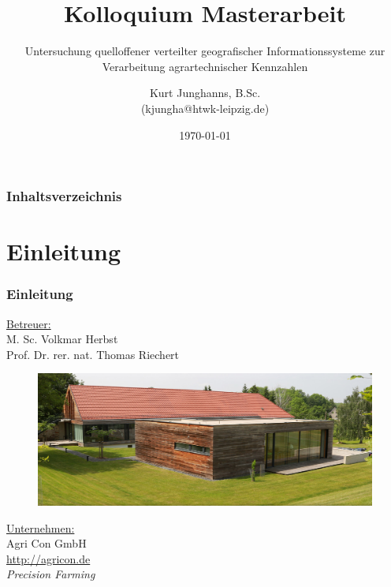 \documentclass{beamer}
\begin{document}
\title{Kolloquium Masterarbeit}
\subtitle{Untersuchung quelloffener verteilter geografischer Informationssysteme zur Verarbeitung agrartechnischer Kennzahlen} 
\author{Kurt Junghanns, B.Sc. \\(kjungha@htwk-leipzig.de)} 
\date{\today}

\begin{frame}
\titlepage
\end{frame}

\begin{frame}
\frametitle{Inhaltsverzeichnis}\tableofcontents
\end{frame}

\section{Einleitung}
\begin{frame}\frametitle{Einleitung}
\underline{Betreuer:}\\
M. Sc. Volkmar Herbst\\
Prof. Dr. rer. nat. Thomas Riechert\\
\vspace{\baselineskip}
\begin{figure}\centering
    \includegraphics[scale=0.21]{Firma.png}
\end{figure}
\underline{Unternehmen:}\\
Agri Con GmbH\\\url{http://agricon.de}\\
\vspace{\baselineskip}
\vspace{\baselineskip}
\textit{Precision Farming}
\end{frame}
\end{document}
